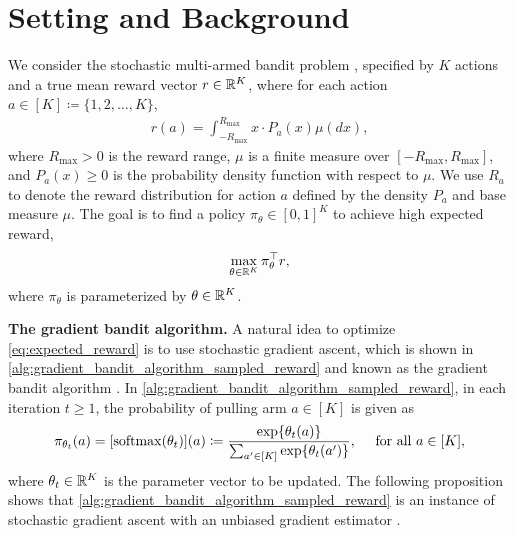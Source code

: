 \section{Setting and Background}

We consider the stochastic multi-armed bandit problem \citep{lattimore2020bandit}, specified by $K$ actions and a true mean reward vector $r \in {\mathbb{R}}^K$, where for each action $a \in [K] \coloneqq \{1, 2, \dots, K \}$,
\begin{align}
\label{eq:true_mean_reward_expectation_bounded_sampled_reward}
    r(a) = \int_{-R_{\max}}^{R_{\max}}{ x \cdot P_a(x) \mu(d x)},
\end{align}
where $R_{\max} > 0$ is the reward range, $\mu$ is a finite measure over $[-R_{\max}, R_{\max}]$, and $P_a(x) \ge 0$ is the probability density function with respect to $\mu$.
We use $R_a$ to denote the reward distribution for action $a$ defined by the density $P_a$ and base measure $\mu$. The goal is to find a policy $\pi_{\theta} \in [0, 1]^K$ to achieve high expected reward,
\begin{align}
\label{eq:expected_reward}
    \max_{\theta \in {\mathbb{R}}^K}{ \pi_{\theta}^\top r},
\end{align}
where $\pi_\theta$ is parameterized by $\theta \in {\mathbb{R}}^K$. 

\textbf{The gradient bandit algorithm.} A natural idea to optimize \cref{eq:expected_reward} is to use stochastic gradient ascent, which is shown in \cref{alg:gradient_bandit_algorithm_sampled_reward} and known as the gradient bandit algorithm \citep[Section 2.8]{sutton2018reinforcement}. In \cref{alg:gradient_bandit_algorithm_sampled_reward}, in each iteration $t \ge 1$, the probability of pulling arm $a \in [K]$ is given as 
\begin{align}
\label{eq:softmax}
    \pi_{\theta_t}(a) = [ \mathrm{softmax}(\theta_t) ](a) \coloneqq
    \frac{ \exp\{ \theta_t(a) \} }{ \sum_{a^\prime \in [K]}{ \exp\{ \theta_t(a^\prime) } \} }, \mbox{ \quad   for all } a \in [K],
\end{align}
where $\theta_t \in {\mathbb{R}}^{K}$ is the parameter vector to be updated. The following proposition shows that \cref{alg:gradient_bandit_algorithm_sampled_reward} is an instance of stochastic gradient ascent with an unbiased gradient estimator \citep{sutton2018reinforcement,mei2024stochastic}.

